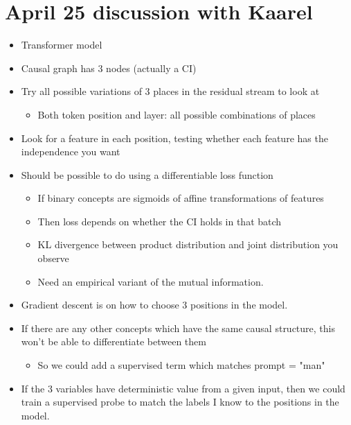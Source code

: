 \documentclass{article}
\begin{document}
\section{April 25 discussion with Kaarel}
\begin{itemize}
    \item Transformer model
    \item Causal graph has 3 nodes (actually a CI)
    \item Try all possible variations of 3 places in the residual stream to look at
    \begin{itemize}
        \item Both token position and layer: all possible combinations of places
    \end{itemize}
    \item Look for a feature in each position, testing whether each feature has the independence you want
    \item Should be possible to do using a differentiable loss function
    \begin{itemize}
        \item If binary concepts are sigmoids of affine transformations of features
        \item Then loss depends on whether the CI holds in that batch
        \item KL divergence between product distribution and joint distribution you observe
        \item Need an empirical variant of the mutual information.
    \end{itemize}
    \item Gradient descent is on how to choose 3 positions in the model.
    \item If there are any other concepts which have the same causal structure, this won't be able to differentiate between them
    \begin{itemize}
        \item So we could add a supervised term which matches prompt = "man"
    \end{itemize}
    \item If the 3 variables have deterministic value from a given input, then we could train a supervised probe to match the labels I know to the positions in the model.
\end{itemize}
\end{document}
